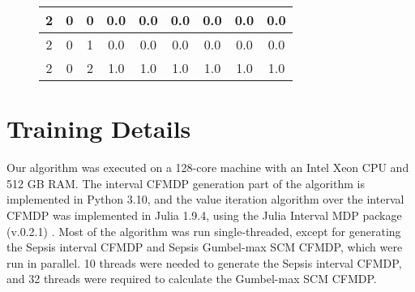 \begin{figure}[h]
\begin{minipage}[b]{0.55\textwidth}
{\begin{tabular}{|c|c|c|c|cc|c|cc|}
2                               & 0                               & 0       & 0.0                            & \multicolumn{1}{c|}{0.0}                                     & 0.0                                    & 0.0                                  & \multicolumn{1}{c|}{0.0}                                      & 0.0                                     \\ \hline
2                               & 0                               & 1       & 0.0                            & \multicolumn{1}{c|}{0.0}                                     & 0.0                                    & 0.0                                  & \multicolumn{1}{c|}{0.0}                                      & 0.0                                     \\ \hline
2                               & 0                               & 2      & 1.0                             & \multicolumn{1}{c|}{1.0}                                     & 1.0                                    & 1.0                                  & \multicolumn{1}{c|}{1.0}                                      & 1.0                                     \\ \hline
\end{tabular}
            }
    \end{minipage}
\end{figure}



\section{Training Details}
\label{app: training details}
Our algorithm was executed on a 128-core machine with an Intel Xeon CPU and 512 GB RAM. The interval CFMDP generation part of the algorithm is implemented in Python 3.10, and the value iteration algorithm over the interval CFMDP was implemented in Julia 1.9.4, using the Julia Interval MDP package (v.0.2.1) \citep{mathiesen2024intervalmdp}. Most of the algorithm was run single-threaded, except for generating the Sepsis interval CFMDP and Sepsis Gumbel-max SCM CFMDP, which were run in parallel. 10 threads were needed to generate the Sepsis interval CFMDP, and 32 threads were required to calculate the Gumbel-max SCM CFMDP.

%
%
%
%
%
%